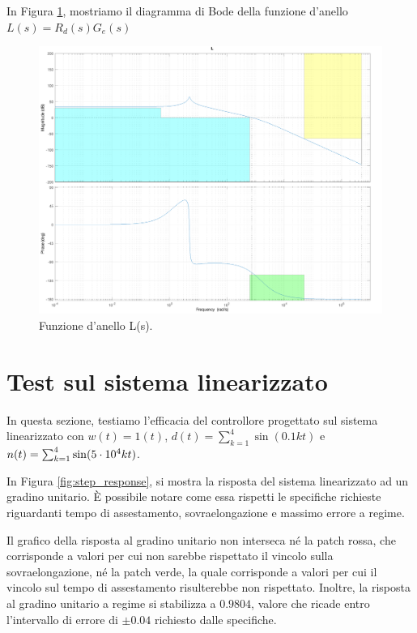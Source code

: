 \documentclass[a4paper, 11pt]{article}
\begin{document}
In Figura \ref{fig:funzione_anello}, mostriamo il diagramma di Bode della funzione d'anello $L(s) = R_d(s) G_e(s)$

\begin{figure}[h!]
	\centering
	\includegraphics[width=0.75\linewidth]{./images/funzione_anello.png}
	\caption{Funzione d'anello L(s).}
	\label{fig:funzione_anello}
\end{figure}

\section{Test sul sistema linearizzato}

In questa sezione, testiamo l'efficacia del controllore progettato sul sistema linearizzato con $w(t) = 1(t)$, $d(t)=\sum_{k = 1}^{4} \sin(0.1kt)$ e $n(t)=\sum_{k = 1}^{4} \sin(5\space\cdot\space 10^{4}kt) $.

In Figura \ref{fig:step_response}, si mostra la risposta del sistema linearizzato ad un gradino unitario. \`E possibile notare come essa rispetti le specifiche richieste riguardanti tempo di assestamento, sovraelongazione e massimo errore a regime. 

Il grafico della risposta al gradino unitario non interseca né la patch rossa, che corrisponde a valori per cui non sarebbe rispettato il vincolo sulla sovraelongazione,
né la patch verde, la quale corrisponde a valori per cui il vincolo sul tempo di assestamento risulterebbe non rispettato. 
Inoltre, la risposta al gradino unitario a regime si stabilizza a $0.9804$, valore che ricade entro l'intervallo di errore di $\pm0.04$ richiesto dalle specifiche.
\end{document}
